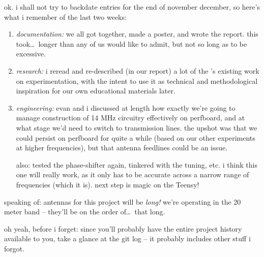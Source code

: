 ok. i shall not try to backdate entries for the end of november \amp december,
so here's what i remember of the last two weeks:
\begin{enumerate}
	\item \textit{documentation:} we all got together, made a poster, and
	wrote the report. this took\ldots\ longer than any of us would like to
	admit, but not so long as to be excessive.

	\item \textit{research:} i reread and re-described (in our report) a
	lot of the \arrl's existing work on \rf experimentation, with the
	intent to use it as technical and methodological inspiration for our
	own educational materials later.

	\item \textit{engineering:} evan and i discussed at length how exactly
	we're going to manage construction of 14 MHz circuitry effectively on
	perfboard, and at what stage we'd need to switch to transmission lines.
	the upshot was that we could persist on perfboard for quite a while
	(based on our other experiments at higher frequencies), but that
	antenna feedlines could be an issue.

	also: tested the phase-shifter again, tinkered with the tuning, etc. i
	think this one will really work, as it only has to be accurate across a
	narrow range of frequencies (which it is). next step is \dsp magic on
	the Teensy!
\end{enumerate}

speaking of: antennas for this project will be \emph{long!} we're operating in
the 20 meter band -- they'll be on the order of\ldots\ that long.

oh yeah, before i forget: since you'll probably have the entire project history
available to you, take a glance at the git log -- it probably includes other
stuff i forgot.
